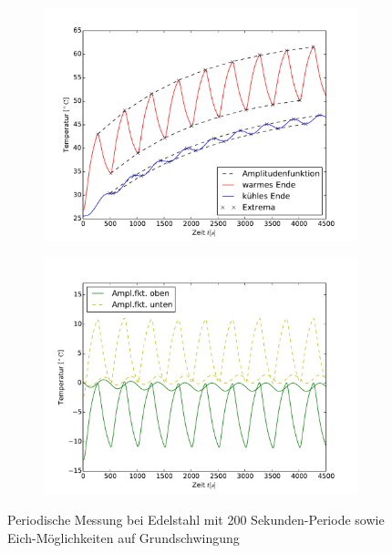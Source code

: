\begin{figure}[h]
	\label{fig:M3Edelstahl}
	\centering
	\begin{subfigure}{0.9\textwidth}
	\centering
	\includegraphics[width=\textwidth]{Bilder/M3_Edelstahl.pdf}
	\end{subfigure}
	\begin{subfigure}{0.9\textwidth}
	\centering
	\includegraphics[width=\textwidth]{Bilder/Normierungsauswahl/M3_Edelstahl_norm.pdf}
	\end{subfigure}
	\caption{Periodische Messung bei Edelstahl mit 200 Sekunden-Periode sowie Eich-Möglichkeiten auf Grundschwingung}
\end{figure}
